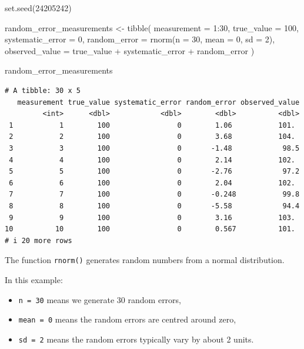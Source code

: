 \documentclass[
  letterpaper,
  DIV=11,
  numbers=noendperiod]{scrreprt}
\newenvironment{Shaded}{\begin{snugshade}}{\end{snugshade}}
\newcommand{\AttributeTok}[1]{\textcolor[rgb]{0.40,0.45,0.13}{#1}}
\newcommand{\DecValTok}[1]{\textcolor[rgb]{0.68,0.00,0.00}{#1}}
\newcommand{\FunctionTok}[1]{\textcolor[rgb]{0.28,0.35,0.67}{#1}}
\newcommand{\NormalTok}[1]{\textcolor[rgb]{0.00,0.23,0.31}{#1}}
\newcommand{\OtherTok}[1]{\textcolor[rgb]{0.00,0.23,0.31}{#1}}
\newcommand{\SpecialCharTok}[1]{\textcolor[rgb]{0.37,0.37,0.37}{#1}}
\providecommand{\tightlist}{%
  \setlength{\itemsep}{0pt}\setlength{\parskip}{0pt}}
\begin{document}
\begin{Shaded}
\begin{Highlighting}[]
\FunctionTok{set.seed}\NormalTok{(}\DecValTok{24205242}\NormalTok{)}

\NormalTok{random\_error\_measurements }\OtherTok{\textless{}{-}} \FunctionTok{tibble}\NormalTok{(}
  \AttributeTok{measurement =} \DecValTok{1}\SpecialCharTok{:}\DecValTok{30}\NormalTok{,}
  \AttributeTok{true\_value =} \DecValTok{100}\NormalTok{,}
  \AttributeTok{systematic\_error =} \DecValTok{0}\NormalTok{,}
  \AttributeTok{random\_error =} \FunctionTok{rnorm}\NormalTok{(}\AttributeTok{n =} \DecValTok{30}\NormalTok{, }\AttributeTok{mean =} \DecValTok{0}\NormalTok{, }\AttributeTok{sd =} \DecValTok{2}\NormalTok{),}
  \AttributeTok{observed\_value =}\NormalTok{ true\_value }\SpecialCharTok{+}\NormalTok{ systematic\_error }\SpecialCharTok{+}\NormalTok{ random\_error}
\NormalTok{)}

\NormalTok{random\_error\_measurements}
\end{Highlighting}
\end{Shaded}

\begin{verbatim}
# A tibble: 30 x 5
   measurement true_value systematic_error random_error observed_value
         <int>      <dbl>            <dbl>        <dbl>          <dbl>
 1           1        100                0        1.06           101. 
 2           2        100                0        3.68           104. 
 3           3        100                0       -1.48            98.5
 4           4        100                0        2.14           102. 
 5           5        100                0       -2.76            97.2
 6           6        100                0        2.04           102. 
 7           7        100                0       -0.248           99.8
 8           8        100                0       -5.58            94.4
 9           9        100                0        3.16           103. 
10          10        100                0        0.567          101. 
# i 20 more rows
\end{verbatim}

The function \texttt{rnorm()} generates random numbers from a normal
distribution.

In this example:

\begin{itemize}
\tightlist
\item
  \texttt{n\ =\ 30} means we generate 30 random errors,
\item
  \texttt{mean\ =\ 0} means the random errors are centred around zero,
\item
  \texttt{sd\ =\ 2} means the random errors typically vary by about 2
  units.
\end{itemize}
\end{document}
